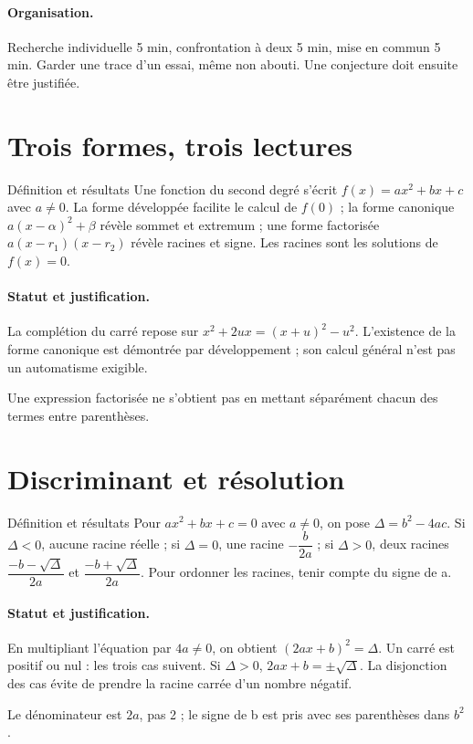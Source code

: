 \paragraph{Organisation.} Recherche individuelle 5 min, confrontation à deux 5 min, mise en commun 5 min. Garder une trace d’un essai, même non abouti. Une conjecture doit ensuite être justifiée.
\section{Trois formes, trois lectures}\label{C02-U1}
\begin{repere}{Définition et résultats}
Une fonction du second degré s’écrit $f(x)=ax^2+bx+c$ avec $a\ne0$. La forme développée facilite le calcul de $f(0)$ ; la forme canonique $a(x-\alpha)^2+\beta$ révèle sommet et extremum ; une forme factorisée $a(x-r_1)(x-r_2)$ révèle racines et signe. Les racines sont les solutions de $f(x)=0$.
\end{repere}
\paragraph{Statut et justification.} La complétion du carré repose sur $x^2+2ux=(x+u)^2-u^2$. L’existence de la forme canonique est démontrée par développement ; son calcul général n’est pas un automatisme exigible.
\label{C02-EX1}

\begin{erreur}Une expression factorisée ne s’obtient pas en mettant séparément chacun des termes entre parenthèses.\end{erreur}
\label{C02-AP1}
\section{Discriminant et résolution}\label{C02-U2}
\begin{repere}{Définition et résultats}
Pour $ax^2+bx+c=0$ avec $a\ne0$, on pose $\Delta=b^2-4ac$. Si $\Delta<0$, aucune racine réelle ; si $\Delta=0$, une racine $-\dfrac{b}{2a}$ ; si $\Delta>0$, deux racines $\dfrac{-b-\sqrt\Delta}{2a}$ et $\dfrac{-b+\sqrt\Delta}{2a}$. Pour ordonner les racines, tenir compte du signe de a.
\end{repere}
\paragraph{Statut et justification.} En multipliant l’équation par $4a\ne0$, on obtient $(2ax+b)^2=\Delta$. Un carré est positif ou nul : les trois cas suivent. Si $\Delta>0$, $2ax+b=\pm\sqrt\Delta$. La disjonction des cas évite de prendre la racine carrée d’un nombre négatif.
\label{C02-EX2}
\begin{erreur}Le dénominateur est $2a$, pas 2 ; le signe de b est pris avec ses parenthèses dans $b^2$.\end{erreur}
\label{C02-AP2}
